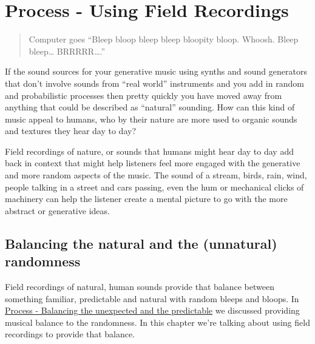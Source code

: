\documentclass[
  12pt,
  letterpaper,
  oneside,
  open=any]{scrbook}
\begin{document}

\chapter{Process - Using Field
Recordings}\label{Chapter-019-Process-Using_Field_Recordings}

\begin{quote}
Computer goes ``Bleep bloop bleep bleep bloopity bloop. Whoosh. Bleep
bleep\ldots{} BRRRRR\ldots.''
\end{quote}

If the sound sources for your generative music using synths and sound
generators that don't involve sounds from ``real world'' instruments and
you add in random and probabilistic processes then pretty quickly you
have moved away from anything that could be described as ``natural''
sounding. How can this kind of music appeal to humans, who by their
nature are more used to organic sounds and textures they hear day to
day?

\begin{tcolorbox}[enhanced jigsaw, opacitybacktitle=0.6, rightrule=.15mm, leftrule=.75mm, opacityback=0, toptitle=1mm, toprule=.15mm, breakable, titlerule=0mm, colback=white, bottomtitle=1mm, title=\textcolor{quarto-callout-tip-color}{\faLightbulb}\hspace{0.5em}{Key idea}, coltitle=black, left=2mm, colframe=quarto-callout-tip-color-frame, bottomrule=.15mm, colbacktitle=quarto-callout-tip-color!10!white, arc=.35mm]

Field recordings of nature, or sounds that humans might hear day to day
add back in context that might help listeners feel more engaged with the
generative and more random aspects of the music. The sound of a stream,
birds, rain, wind, people talking in a street and cars passing, even the
hum or mechanical clicks of machinery can help the listener create a
mental picture to go with the more abstract or generative ideas.

\end{tcolorbox}

\section{Balancing the natural and the (unnatural)
randomness}\label{balancing-the-natural-and-the-unnatural-randomness}

Field recordings of natural, human sounds provide that balance between
something familiar, predictable and natural with random bleeps and
bloops. In
\hyperref[Chapter-009-Process-Balance_unexpected_and_predictable]{Process
- Balancing the unexpected and the predictable} we discussed providing
musical balance to the randomness. In this chapter we're talking about
using field recordings to provide that balance.
\end{document}
